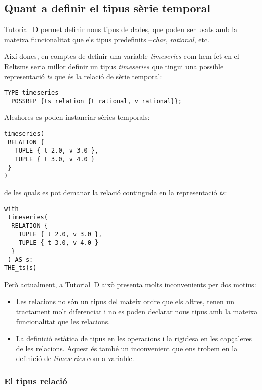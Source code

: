 \subsection{Quant a definir el tipus sèrie temporal}
\label{sec:implementacio:tipus-relacional}

Tutorial~D permet definir nous tipus de dades, que poden ser usats amb
la mateixa funcionalitat que els tipus predefinits --\emph{char},
\emph{rational}, etc.  

Així doncs, en comptes de definir una variable \emph{timeseries} com
hem fet en el Reltsms seria millor definir un tipus \emph{timeseries}
que tingui una possible representació \emph{ts} que és la relació de
sèrie temporal:
\begin{lstlisting}[style=tutorialD]
TYPE timeseries
  POSSREP {ts relation {t rational, v rational}};
\end{lstlisting}


Aleshores es poden instanciar sèries temporals:
\begin{lstlisting}[style=tutorialD]
timeseries(
 RELATION {
   TUPLE { t 2.0, v 3.0 },
   TUPLE { t 3.0, v 4.0 }
 }
)
\end{lstlisting}

de les quals es pot demanar la relació continguda en la representació \emph{ts}:
\begin{lstlisting}[style=tutorialD]
with
 timeseries(
  RELATION {
    TUPLE { t 2.0, v 3.0 },
    TUPLE { t 3.0, v 4.0 }
  }
 ) AS s:
THE_ts(s)
\end{lstlisting}



Però actualment, a Tutorial~D això presenta molts inconvenients per dos
motius:
\begin{itemize}

\item Les relacions no són un tipus del mateix ordre que els altres,
  tenen un tractament molt diferenciat i no es poden declarar nous
  tipus amb la mateixa funcionalitat que les relacions.

\item La definició estàtica de tipus en les operacions i la rigidesa
  en les capçaleres de les relacions. Aquest és també un inconvenient
  que ens trobem en la definició de \emph{timeseries} com a variable.

\end{itemize}



\subsubsection{El tipus relació}
\todo{}

